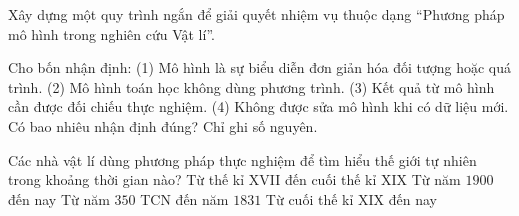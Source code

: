 \begin{bt}
Xây dựng một quy trình ngắn để giải quyết nhiệm vụ thuộc dạng “Phương pháp mô hình trong nghiên cứu Vật lí”.
\end{bt}

\begin{ex}
Cho bốn nhận định: (1) Mô hình là sự biểu diễn đơn giản hóa đối tượng hoặc quá trình. (2) Mô hình toán học không dùng phương trình. (3) Kết quả từ mô hình cần được đối chiếu thực nghiệm. (4) Không được sửa mô hình khi có dữ liệu mới. Có bao nhiêu nhận định đúng? Chỉ ghi số nguyên.
\end{ex}

\begin{ex}
Các nhà vật lí dùng phương pháp thực nghiệm để tìm hiểu thế giới tự nhiên trong khoảng thời gian nào?
\choice
{\True Từ thế kỉ XVII đến cuối thế kỉ XIX}
{Từ năm $1900$ đến nay}
{Từ năm $350$ TCN đến năm $1831$}
{Từ cuối thế kỉ XIX đến nay}
\end{ex}

